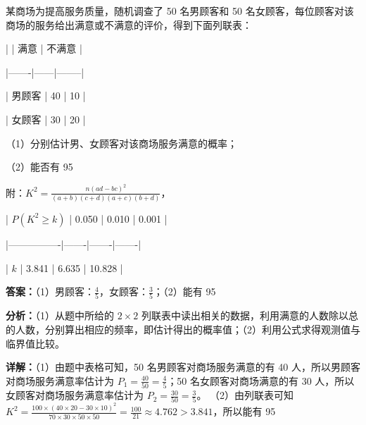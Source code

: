 \begin{question}[points=12]
某商场为提高服务质量，随机调查了 50 名男顾客和 50 名女顾客，每位顾客对该商场的服务给出满意或不满意的评价，得到下面列联表：



| | 满意 | 不满意 |

|-------|------|--------|

| 男顾客 | 40 | 10 |

| 女顾客 | 30 | 20 |



（1）分别估计男、女顾客对该商场服务满意的概率；

（2）能否有 95%



附：$K^2 = \frac{n(ad-bc)^2}{(a+b)(c+d)(a+c)(b+d)}$，



| $P(K^2 \ge k)$ | 0.050 | 0.010 | 0.001 |

|----------------|-------|-------|-------|

| $k$ | 3.841 | 6.635 | 10.828 |
\begin{solution}
\textbf{答案：}（1）男顾客：$\frac{4}{5}$，女顾客：$\frac{3}{5}$；（2）能有 95%

\textbf{分析：}（1）从题中所给的 $2\times2$ 列联表中读出相关的数据，利用满意的人数除以总的人数，分别算出相应的频率，即估计得出的概率值；（2）利用公式求得观测值与临界值比较。

\textbf{详解：}（1）由题中表格可知，50 名男顾客对商场服务满意的有 40 人，所以男顾客对商场服务满意率估计为 $P_1 = \frac{40}{50} = \frac{4}{5}$；50 名女顾客对商场满意的有 30 人，所以女顾客对商场服务满意率估计为 $P_2 = \frac{30}{50} = \frac{3}{5}$。
（2）由列联表可知 $K^2 = \frac{100 \times (40 \times 20 - 30 \times 10)^2}{70 \times 30 \times 50 \times 50} = \frac{100}{21} \approx 4.762 > 3.841$，所以能有 95%
\end{solution}
\end{question}

